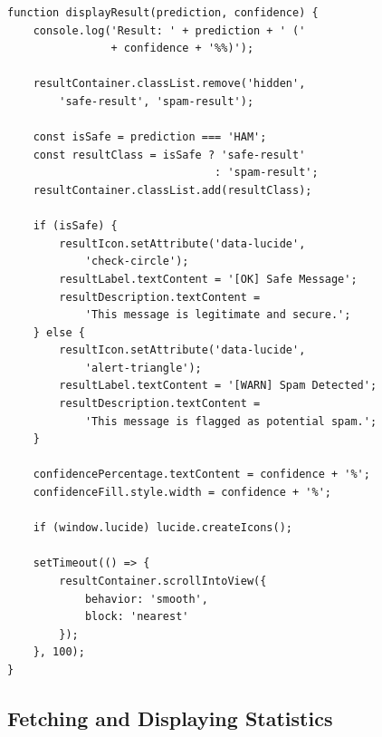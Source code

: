 \documentclass[12pt, a4paper]{article}
\begin{document}
\begin{verbatim}
function displayResult(prediction, confidence) {
    console.log('Result: ' + prediction + ' (' 
                + confidence + '%%)');
    
    resultContainer.classList.remove('hidden', 
        'safe-result', 'spam-result');
    
    const isSafe = prediction === 'HAM';
    const resultClass = isSafe ? 'safe-result' 
                                : 'spam-result';
    resultContainer.classList.add(resultClass);
    
    if (isSafe) {
        resultIcon.setAttribute('data-lucide', 
            'check-circle');
        resultLabel.textContent = '[OK] Safe Message';
        resultDescription.textContent = 
            'This message is legitimate and secure.';
    } else {
        resultIcon.setAttribute('data-lucide', 
            'alert-triangle');
        resultLabel.textContent = '[WARN] Spam Detected';
        resultDescription.textContent = 
            'This message is flagged as potential spam.';
    }
    
    confidencePercentage.textContent = confidence + '%';
    confidenceFill.style.width = confidence + '%';
    
    if (window.lucide) lucide.createIcons();
    
    setTimeout(() => {
        resultContainer.scrollIntoView({ 
            behavior: 'smooth', 
            block: 'nearest' 
        });
    }, 100);
}
\end{verbatim}

\subsection{Fetching and Displaying Statistics}
\end{document}
